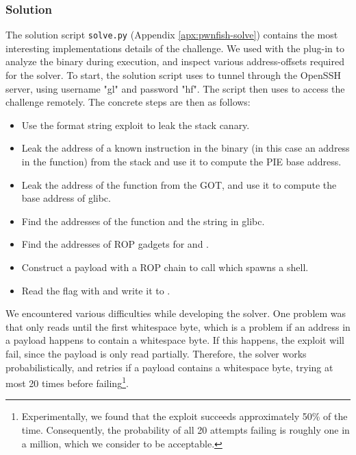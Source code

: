 \subsubsection{Solution}
The solution script \texttt{solve.py} (Appendix \ref{apx:pwnfish-solve}) contains the most interesting implementations details of the challenge. We used \cite{gdb} with the \cite{pwndbg} plug-in to analyze the binary during execution, and inspect various address-offsets required for the solver. To start, the solution script uses \cite{sshtunnel} to tunnel through the OpenSSH server, using username "gl" and password "hf". The script then uses \cite{github__pwntools} to access the challenge remotely. The concrete steps are then as follows:
\begin{itemize}
    \item Use the format string exploit to leak the stack canary.
    \item Leak the address of a known instruction in the binary (in this case an address in the  function) from the stack and use it to compute the PIE base address.
    \item Leak the address of the  function from the GOT, and use it to compute the base address of glibc.
    \item Find the addresses of the  function and the string  in glibc.
    \item Find the addresses of ROP gadgets for  and .
    \item Construct a payload with a ROP chain to call  which spawns a shell.
    \item Read the flag with  and write it to .
\end{itemize}
We encountered various difficulties while developing the solver. 
One problem was that  only reads until the first whitespace byte, which is a problem if an address in a payload happens to contain a whitespace byte. If this happens, the exploit will fail, since the payload is only read partially. Therefore, the solver works probabilistically, and retries if a payload contains a whitespace byte, trying at most 20 times before failing\footnote{Experimentally, we found that the exploit succeeds approximately 50\% of the time. Consequently, the probability of all 20 attempts failing is roughly one in a million, which we consider to be acceptable.}.

